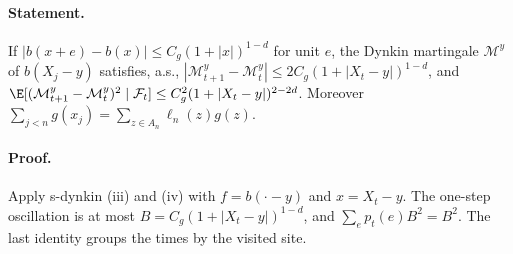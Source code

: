 \paragraph{Statement.} If $|b(x+e)-b(x)|\leq C_g(1+|x|)^{1-d}$ for unit $e$, the Dynkin martingale $\mathcal M^y$ of
$b(X_j-y)$ satisfies, a.s., $|\mathcal M^y_{t+1}-\mathcal M^y_t|\leq2C_g(1+|X_t-y|)^{1-d}$, and
$\E[(\mathcal M^y_{t+1}-\mathcal M^y_t)^2\mid\mathcal F_t]\leq C_g^2(1+|X_t-y|)^{2-2d}$. Moreover
$\sum_{j<n}g(x_j)=\sum_{z\in A_n}\ell_n(z)g(z)$.
\paragraph{Proof.} Apply s-dynkin (iii) and (iv) with $f=b(\cdot-y)$ and $x=X_t-y$. The one-step oscillation is at most
$B=C_g(1+|X_t-y|)^{1-d}$, and $\sum_ep_t(e)B^2=B^2$. The last identity groups the times by the visited site.
